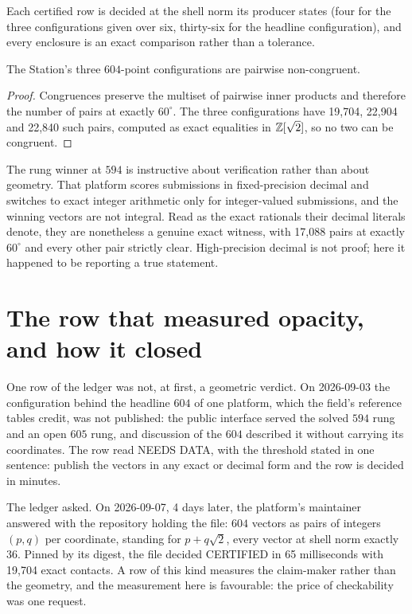 \documentclass[11pt]{article}
\begin{document}
Each certified row is decided at the shell norm its producer states (four for
the three configurations given over six, thirty-six for the headline
configuration), and every enclosure is an exact comparison rather than a
tolerance.

\begin{corollary}
The Station's three $604$-point configurations are pairwise non-congruent.
\end{corollary}

\begin{proof}
Congruences preserve the multiset of pairwise inner products and therefore the
number of pairs at exactly $60^\circ$. The three configurations have
19,704, 22,904 and 22,840 such pairs,
computed as exact equalities in $\mathbb{Z}[\sqrt2]$, so no two can be congruent.
\end{proof}

\begin{remark}
The rung winner at $594$ is instructive about verification rather than about
geometry. That platform scores submissions in fixed-precision decimal and
switches to exact integer arithmetic only for integer-valued submissions, and
the winning vectors are not integral. Read as the exact rationals their decimal
literals denote, they are nonetheless a genuine exact witness, with
17,088 pairs at exactly $60^\circ$ and every other pair strictly
clear. High-precision decimal is not proof; here it happened to be reporting a
true statement.
\end{remark}

\section{The row that measured opacity, and how it closed}

One row of the ledger was not, at first, a geometric verdict. On
2026-09-03 the configuration behind the headline $604$ of one
platform, which the field's reference tables credit, was not published: the
public interface served the solved $594$ rung and an open $605$ rung, and
discussion of the $604$ described it without carrying its coordinates. The row
read NEEDS DATA, with the threshold stated in one sentence: publish the vectors
in any exact or decimal form and the row is decided in minutes.

The ledger asked. On 2026-09-07, 4 days later, the
platform's maintainer answered with the repository holding the file: $604$
vectors as pairs of integers $(p,q)$ per coordinate, standing for $p+q\sqrt2$,
every vector at shell norm exactly $36$. Pinned by its digest, the file decided
CERTIFIED in 65 milliseconds with 19,704 exact contacts.
A row of this kind measures the claim-maker rather than the geometry, and the
measurement here is favourable: the price of checkability was one request.
\end{document}
